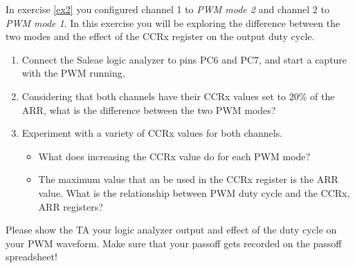 \documentclass[openany,11pt,fleqn]{book} %
\begin{document}
\begin{exercise}
    In exercise \ref{ex2} you configured channel 1 to \textit{PWM mode 2} and channel 2 to \textit{PWM mode 1}. In this exercise you will be exploring the difference between the two modes and the effect of the CCRx register on the output duty cycle. 
    
    \begin{enumerate}
        \item Connect the Saleae logic analyzer to pins PC6 and PC7, and start a capture with the PWM running.
        \item Considering that both channels have their CCRx values set to 20\% of the ARR, what is the difference between the two PWM modes?
        \item Experiment with a variety of CCRx values for both channels. 
        \begin{itemize}
            \item What does increasing the CCRx value do for each PWM mode?
            \item The maximum value that an be used in the CCRx register is the ARR value. What is the relationship between PWM duty cycle and the CCRx, ARR registers?
        \end{itemize}
    \end{enumerate}
    
\end{exercise}

\begin{assignment}
	Please show the TA your logic analyzer output and effect of the duty cycle on your PWM waveform. Make sure that your passoff gets recorded on the passoff spreadsheet!
\end{assignment}
\end{document}
